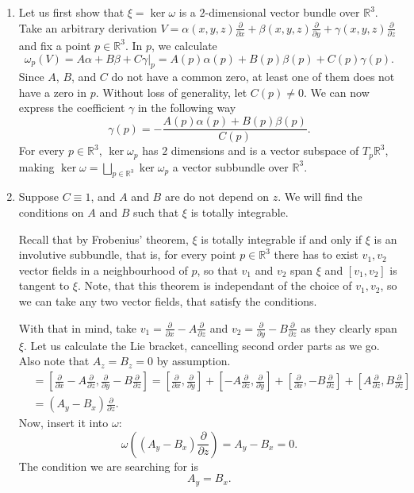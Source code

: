 \documentclass[a4paper, 12pt]{article} %
\newcommand{\R}{\mathbb{R}}
\begin{document}
\begin{enumerate}[label=(\alph*)]
	\item Let us first show that $\xi = \ker \omega$ is a $2$-dimensional vector bundle over $\R^3$. Take an arbitrary derivation $V = \alpha(x, y, z)\frac{\partial}{\partial x} + \beta(x, y, z)\frac{\partial}{\partial y} + \gamma(x, y, z)\frac{\partial}{\partial z}$ and fix a point $p \in \R^3$. In $p$, we calculate
	\[
	\omega_p(V) = A\alpha + B\beta + C\gamma |_p = A(p)\alpha(p) + B(p)\beta(p) + C(p)\gamma(p).
	\]
	Since $A$, $B$, and $C$ do not have a common zero, at least one of them does not have a zero in $p$. Without loss of generality, let $C(p) \neq 0$. We can now express the coefficient $\gamma$ in the following way
	\[
	\gamma(p) = -\frac{A(p)\alpha(p) + B(p)\beta(p)}{C(p)}.
	\]
	For every $p \in \R^3$, $\ker\omega_p$ has $2$ dimensions and is a vector subspace of $T_p\R^3$, making $\ker\omega = \bigsqcup_{p\in\R^3}\ker\omega_p$ a vector subbundle over $\R^3$.
	
	\item Suppose $C \equiv 1$, and $A$ and $B$ are do not depend on $z$. We will find the conditions on $A$ and $B$ such that $\xi$ is totally integrable.
	
	Recall that by Frobenius' theorem, $\xi$ is totally integrable if and only if $\xi$ is an involutive subbundle, that is, for every point $p \in \R^3$ there has to exist $v_1, v_2$ vector fields in a neighbourhood of $p$, so that $v_1$ and $v_2$ span $\xi$ and $[v_1, v_2]$ is tangent to $\xi$. Note, that this theorem is independant of the choice of $v_1, v_2$, so we can take any two vector fields, that satisfy the conditions.
	
	With that in mind, take $v_1 = \frac{\partial}{\partial x} - A\frac{\partial}{\partial z}$ and $v_2 = \frac{\partial}{\partial y} - B\frac{\partial}{\partial z}$ as they clearly span $\xi$. Let us calculate the Lie bracket, cancelling second order parts as we go. Also note that $A_z = B_z = 0$ by assumption.
	\begin{align*}
	[v_1, v_2] &= [\frac{\partial}{\partial x} - A\frac{\partial}{\partial z}, \frac{\partial}{\partial y} - B\frac{\partial}{\partial z}] = [\frac{\partial}{\partial x}, \frac{\partial}{\partial y}] + [-A \frac{\partial}{\partial z}, \frac{\partial}{\partial y}] + [\frac{\partial}{\partial x}, -B \frac{\partial}{\partial z}] + [A\frac{\partial}{\partial z}, B\frac{\partial}{\partial z}] \\
	& = (A_y - B_x)\frac{\partial}{\partial z}.
	\end{align*}
	Now, insert it into $\omega$:
	\[
	\omega((A_y - B_x)\frac{\partial}{\partial z}) = A_y - B_x = 0.
	\]
	The condition we are searching for is
	\[
	A_y = B_x.
	\]
	

\end{enumerate}
\end{document}
